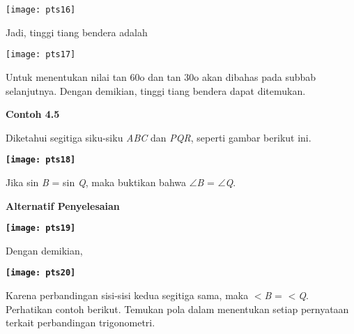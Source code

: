 \documentclass[11pt,fleqn]{book} %
\begin{document}
\noindent 

\noindent \texttt{[image: pts16]}

\noindent 

\noindent Jadi, tinggi tiang bendera adalah

\noindent 

\noindent \texttt{[image: pts17]}

\noindent 

\noindent Untuk menentukan nilai tan 60o dan tan 30o akan dibahas pada subbab selanjutnya. Dengan demikian, tinggi tiang bendera dapat ditemukan.

\noindent 

\noindent \textbf{Contoh 4.5}

\noindent \textbf{}

\noindent Diketahui segitiga siku-siku \textit{ABC }dan \textit{PQR}, seperti gambar berikut ini.

\noindent 

\noindent \textbf{\texttt{[image: pts18]}}

\noindent 

\noindent Jika sin \textit{B }= sin \textit{Q}, maka buktikan bahwa $\mathrm{\angle}$\textit{B }= $\mathrm{\angle}$\textit{Q}.

\noindent 

\noindent 

\noindent 

\noindent 

\noindent \textbf{Alternatif Penyelesaian}

\noindent \textbf{}

\noindent \textbf{\texttt{[image: pts19]}}

\noindent \textbf{}

\noindent Dengan demikian,

\noindent 

\noindent \textbf{\texttt{[image: pts20]}}

\noindent \textbf{}

\noindent Karena perbandingan sisi-sisi kedua segitiga sama, maka $<$\textit{B }= $<$\textit{Q}. Perhatikan contoh berikut. Temukan pola dalam menentukan setiap pernyataan terkait perbandingan trigonometri.

\noindent \textbf{}
\end{document}
